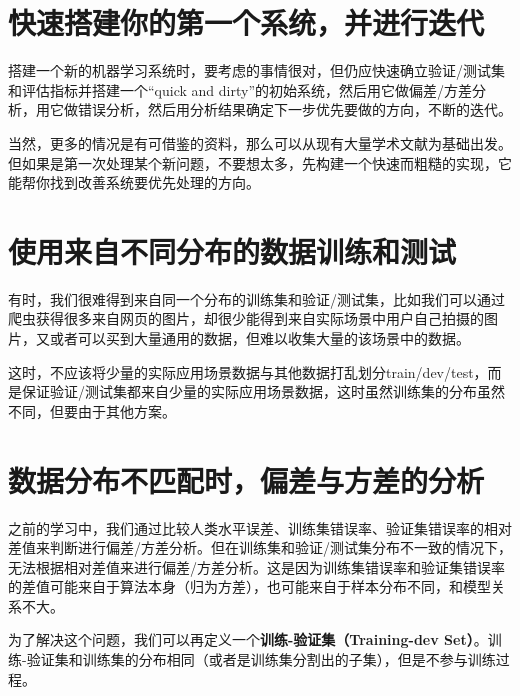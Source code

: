 \documentclass[../../main.tex]{subfiles}
\begin{document}
\section{快速搭建你的第一个系统，并进行迭代}

搭建一个新的机器学习系统时，要考虑的事情很对，但仍应快速确立验证/测试集和评估指标并搭建一个“quick and dirty”的初始系统，然后用它做偏差/方差分析，用它做错误分析，然后用分析结果确定下一步优先要做的方向，不断的迭代。

当然，更多的情况是有可借鉴的资料，那么可以从现有大量学术文献为基础出发。但如果是第一次处理某个新问题，不要想太多，先构建一个快速而粗糙的实现，它能帮你找到改善系统要优先处理的方向。

\section{使用来自不同分布的数据训练和测试}
有时，我们很难得到来自同一个分布的训练集和验证/测试集，比如我们可以通过爬虫获得很多来自网页的图片，却很少能得到来自实际场景中用户自己拍摄的图片，又或者可以买到大量通用的数据，但难以收集大量的该场景中的数据。

这时，不应该将少量的实际应用场景数据与其他数据打乱划分train/dev/test，而是保证验证/测试集都来自少量的实际应用场景数据，这时虽然训练集的分布虽然不同，但要由于其他方案。

\section{数据分布不匹配时，偏差与方差的分析}
之前的学习中，我们通过比较人类水平误差、训练集错误率、验证集错误率的相对差值来判断进行偏差/方差分析。但在训练集和验证/测试集分布不一致的情况下，无法根据相对差值来进行偏差/方差分析。这是因为训练集错误率和验证集错误率的差值可能来自于算法本身（归为方差），也可能来自于样本分布不同，和模型关系不大。

为了解决这个问题，我们可以再定义一个\textbf{训练-验证集（Training-dev Set）}。训练-验证集和训练集的分布相同（或者是训练集分割出的子集），但是不参与训练过程。
\begin{figure}[H]
    \centering
\end{figure}
\end{document}
